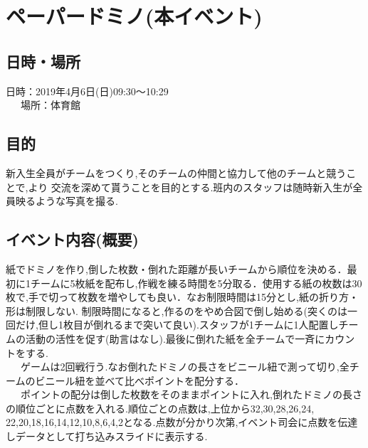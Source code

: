 \section{ペーパードミノ(本イベント)}
\subsection{日時・場所}
日時：2019年4月6日(日)09:30〜10:29\\
\ \ \ 場所：体育館\\
\subsection{目的}
新入生全員がチームをつくり,そのチームの仲間と協力して他のチームと競うことで,より
交流を深めて貰うことを目的とする.班内のスタッフは随時新入生が全員映るような写真を撮る.
\subsection{イベント内容(概要)}
紙でドミノを作り,倒した枚数・倒れた距離が長いチームから順位を決める．最初に1チームに5枚紙を配布し,作戦を練る時間を5分取る．使用する紙の枚数は30枚で,手で切って枚数を増やしても良い．なお制限時間は15分とし,紙の折り方・形は制限しない.
制限時間になると,作るのをやめ合図で倒し始める(突くのは一回だけ,但し1枚目が倒れるまで突いて良い).スタッフが1チームに1人配置しチームの活動の活性を促す(助言はなし).最後に倒れた紙を全チームで一斉にカウントをする.\\
\ \ \ ゲームは2回戦行う.なお倒れたドミノの長さをビニール紐で測って切り,全チームのビニール紐を並べて比べポイントを配分する．\\
\ \ \ ポイントの配分は倒した枚数をそのままポイントに入れ,倒れたドミノの長さの順位ごとに点数を入れる.順位ごとの点数は,上位から32,30,28,26,24,
22,20,18,16,14,12,10,8,6,4,2となる.点数が分かり次第,イベント司会に点数を伝達しデータとして打ち込みスライドに表示する.

